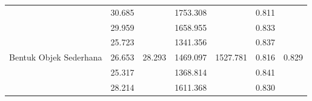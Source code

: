 \begin{table}[]
\begin{tabular}{|l|cc|cc|cc|}
                                                      & \multicolumn{1}{c|}{\cellcolor[HTML]{FFFFFF}30.685} & \cellcolor[HTML]{FFFFFF}                         & \multicolumn{1}{c|}{\cellcolor[HTML]{FFFFFF}1753.308} & \cellcolor[HTML]{FFFFFF}                           & \multicolumn{1}{c|}{\cellcolor[HTML]{FFFFFF}0.811} & \cellcolor[HTML]{FFFFFF}                        \\ \cline{2-2} \cline{4-4} \cline{6-6}
                                                      & \multicolumn{1}{c|}{\cellcolor[HTML]{FFFFFF}29.959} & \cellcolor[HTML]{FFFFFF}                         & \multicolumn{1}{c|}{\cellcolor[HTML]{FFFFFF}1658.955} & \cellcolor[HTML]{FFFFFF}                           & \multicolumn{1}{c|}{\cellcolor[HTML]{FFFFFF}0.833} & \cellcolor[HTML]{FFFFFF}                        \\ \cline{2-2} \cline{4-4} \cline{6-6}
                                                      & \multicolumn{1}{c|}{\cellcolor[HTML]{FFFFFF}25.723} & \cellcolor[HTML]{FFFFFF}                         & \multicolumn{1}{c|}{\cellcolor[HTML]{FFFFFF}1341.356} & \cellcolor[HTML]{FFFFFF}                           & \multicolumn{1}{c|}{\cellcolor[HTML]{FFFFFF}0.837} & \cellcolor[HTML]{FFFFFF}                        \\ \cline{2-2} \cline{4-4} \cline{6-6}
  \multirow{-5}{*}{Bentuk Objek Sederhana}            & \multicolumn{1}{c|}{\cellcolor[HTML]{FFFFFF}26.653} & \multirow{-5}{*}{\cellcolor[HTML]{FFFFFF}28.293} & \multicolumn{1}{c|}{\cellcolor[HTML]{FFFFFF}1469.097} & \multirow{-5}{*}{\cellcolor[HTML]{FFFFFF}1527.781} & \multicolumn{1}{c|}{\cellcolor[HTML]{FFFFFF}0.816} & \multirow{-5}{*}{\cellcolor[HTML]{FFFFFF}0.829} \\ \hline
                                                      & \multicolumn{1}{c|}{\cellcolor[HTML]{FFFFFF}25.317} & \cellcolor[HTML]{FFFFFF}                         & \multicolumn{1}{c|}{\cellcolor[HTML]{FFFFFF}1368.814} & \cellcolor[HTML]{FFFFFF}                           & \multicolumn{1}{c|}{\cellcolor[HTML]{FFFFFF}0.841} & \cellcolor[HTML]{FFFFFF}                        \\ \cline{2-2} \cline{4-4} \cline{6-6}
                                                      & \multicolumn{1}{c|}{\cellcolor[HTML]{FFFFFF}28.214} & \cellcolor[HTML]{FFFFFF}                         & \multicolumn{1}{c|}{\cellcolor[HTML]{FFFFFF}1611.368} & \cellcolor[HTML]{FFFFFF}                           & \multicolumn{1}{c|}{\cellcolor[HTML]{FFFFFF}0.830} & \cellcolor[HTML]{FFFFFF}                        \\ \cline{2-2} \cline{4-4} \cline{6-6}

\end{tabular}
\end{table}
